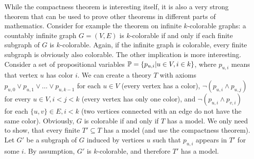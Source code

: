 While the compactness theorem is interesting itself, it is also a very strong theorem that can be used to prove other theorems in different parts of mathematics. Consider for example the theorem on infinite $k$-colorable graphs: a countably infinite graph $G = (V, E)$ is $k$-colorable if and only if each finite subgraph of $G$ is $k$-colorable. Again, if the infinite graph is colorable, every finite subgraph is obviously also colorable. The other implication is more interesting. Consider a set of propositional variables $\mathbb{P} = \{p_{u,i} | u \in V, i \in k\}$, where $p_{u,i}$ means that vertex $u$ has color $i$. We can create a theory $T$ with axioms $p_{u,0} \lor p_{u,1} \lor \dots \lor p_{u,k-1}$ for each $u \in V$ (every vertex has a color), $\neg(p_{u,i} \land p_{u,j})$ for every $u \in V, i < j < k$ (every vertex has only one color), and $\neg(p_{u,i} \land p_{v,i})$ for each $\{u,v\}\in E, i < k$ (two vertices connected with an edge do not have the same color). Obviously, $G$ is colorable if and only if $T$ has a model. We only need to show, that every finite $T' \subseteq T$ has a model (and use the compactness theorem). Let $G'$ be a subgraph of $G$ induced by  vertices $u$ such that $p_{u,i}$ appears in $T'$ for some $i$. By assumption, $G'$ is $k$-colorable, and therefore $T'$ has a model.
